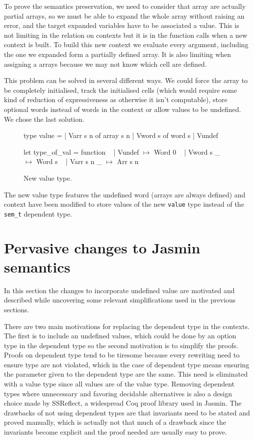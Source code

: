 \documentclass{article}
\begin{document}
\medskip

To prove the semantics preservation, we need to consider that array are actually
partial arrays, so we must be able to expand the whole array without raising an
error, and the target expanded variables have to be associated a value. This is
not limiting in the relation on contexts but it is in the function calls when a
new context is built. To build this new context we evaluate every argument,
including the one we expanded form a partially defined array. It is also
limiting when assigning a arrays because we may not know which cell are defined.

This problem can be solved in several different ways. We could force the array
to be completely initialised, track the initialised cells (which would require
some kind of reduction of expressiveness as otherwise it isn't computable),
store optional words instead of words in the context or allow values to be
undefined. We chose the last solution.

\smallskip

\begin{figure}[t]
\obeylines\obeyspaces\ttfamily%
type value =
| Varr s n of array s n
| Vword s  of word  s
| Vundef

let type\_of\_val = function
~ | Vundef     \(\mapsto\) Word 0
~ | Vword s  \_ \(\mapsto\) Word s
~ | Varr s n \_ \(\mapsto\) Arr s n
\normalfont%
\caption{New value type.}
\end{figure}

The new value type features the undefined word (arrays are always defined) and
context have been modified to store values of the new \texttt{value} type
instead of the \texttt{sem\_t} dependent type.


\section{Pervasive changes to Jasmin semantics}\label{sec:perch}

In this section the changes to incorporate undefined value are motivated and
described while uncovering some relevant simplifications used in the previous
sections.

There are two main motivations for replacing the dependent type in the contexts.
The first is to include an undefined values, which could be done by an option
type in the dependent type so the second motivation is to simplify the proofs.
Proofs on dependent type tend to be tiresome because every rewriting need to
ensure type are not violated, which in the case of dependent type means ensuring
the parameter given to the dependent type are the same. This need is eliminated
with a value type since all values are of the value type. Removing dependent
types where unnecessary and favoring decidable alternatives is also a design
choice made by SSReflect, a widespread Coq proof library used in Jasmin. The
drawbacks of not using dependent types are that invariants need to be stated and
proved manually, which is actually not that much of a drawback since the
invariants become explicit and the proof needed are usually easy to prove.
\end{document}
